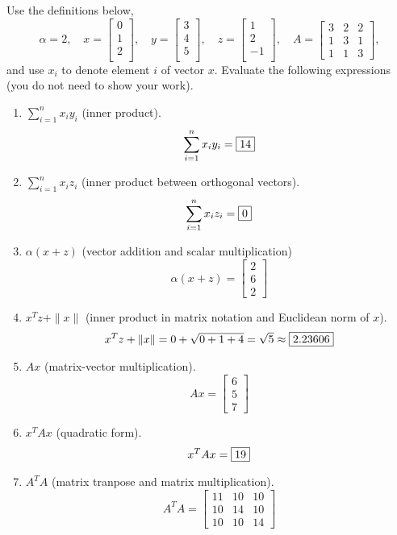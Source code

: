 \documentclass{article}
\def\blu#1{{\color{blu}#1}}
\def\ans#1{{\color{ans}#1}}
\def\norm#1{\|#1\|}
\def\enum#1{\begin{enumerate}#1\end{enumerate}}
\begin{document}
Use the definitions below,
\[
\alpha = 2,\quad
x = \left[\begin{array}{c}
0\\
1\\
2\\
\end{array}\right], \quad
y = \left[\begin{array}{c}
3\\
4\\
5\\
\end{array}\right],\quad
z = \left[\begin{array}{c}
1\\
2\\
-1\\
\end{array}\right],\quad
A = \left[\begin{array}{ccc}
3 & 2 & 2\\
1 & 3 & 1\\
1 & 1 & 3
\end{array}\right],
\]
and use $x_i$ to denote element $i$ of vector $x$.
\blu{Evaluate the following expressions} (you do not need to show your work).
\enum{
\item $\sum_{i=1}^n x_iy_i$ (inner product). 
\ans{\[
    \sum_{i=1}^n x_iy_i = \fbox{14}
\]}
\item $\sum_{i=1}^n x_iz_i$ (inner product between orthogonal vectors).
\ans{\[
    \sum_{i=1}^n x_iz_i = \fbox{0}
\]}
\item $\alpha(x+z)$ (vector addition and scalar multiplication)
\ans{\[
    \alpha(x+z) = 
    \left[
        \begin{array}{c}
            2\\
            6\\
            2
        \end{array}
    \right]
\]}
\item $x^Tz + \norm{x}$ (inner product in matrix notation and Euclidean norm of $x$).
\ans{\[
    x^Tz + \norm{x} = 0 + \sqrt{0+1+4} = \sqrt{5} \approx \fbox{2.23606}
\]}
\item $Ax$ (matrix-vector multiplication).
\ans{\[
    Ax = 
    \left[
        \begin{array}{c}
            6\\
            5\\
            7
        \end{array}
    \right]
\]}
\item $x^TAx$ (quadratic form).
\ans{\[
    x^TAx = \fbox{19}
\]}
\item $A^TA$ (matrix tranpose and matrix multiplication).
\ans{\[
    A^TA = 
    \left[
        \begin{array}{ccc}
            11 & 10 & 10\\
            10 & 14 & 10\\
            10 & 10 & 14
        \end{array}
    \right]
\]}
}
\end{document}
